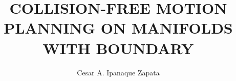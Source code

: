 \documentclass{amsart}
\theoremstyle{definition}
\numberwithin{equation}{section}
\begin{document}
\vspace{0.5in}


\renewcommand{\bf}{\bfseries}
\renewcommand{\sc}{\scshape}
\vspace{0.5in}


\title[COLLISION-FREE MOTION PLANNING ON MANIFOLDS WITH BOUNDARY]%
{COLLISION-FREE MOTION PLANNING ON MANIFOLDS WITH BOUNDARY \\}

\author{Cesar A. Ipanaque Zapata }
\date{} %
\address[Cesar A. Ipanaque. Zapata]{Deparatmento de Matem\'{a}tica,UNIVERSIDADE DE S\~{A}O PAULO
INSTITUTO DE CI\^{E}NCIAS MATEM\'{A}TICAS E DE COMPUTA\c{C}\~{A}O -
USP , Avenida Trabalhador S\~{a}o-carlense, 400 - Centro CEP:
13566-590 - S\~{a}o Carlos - SP, Brasil}



\end{document}
